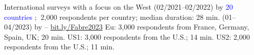 \documentclass[aspectratio=169,xcolor=dvipsnames, 11pt,mathserif]{beamer}
\begin{document}
\begin{frame}{International surveys with a focus on the West\label{questionnaires}}
    \bbvs
    \ip {}  (02/2021--02/2022) by  
    \bbvs \ip \textcolor{blue}{20 countries}%
    ; $~$2,000 respondents per country; median duration: 28 min. \ee
    \ip {} (01--04/2023) by  -- \href{https://bit.ly/Fabre2023}{bit.ly/Fabre2023}
    \bbvs \ip Eu: 3,000 respondents from France, Germany, Spain, UK; 20 min.  \hyperlink{representativeness}{}
    \ip US1: 3,000 respondents from the U.S.; 14 min. 
    \ip US2: 2,000 respondents from the U.S.; 11 min.
    \ee 
    \ee \vspace*{-.2cm}
\end{frame}


\end{document}
